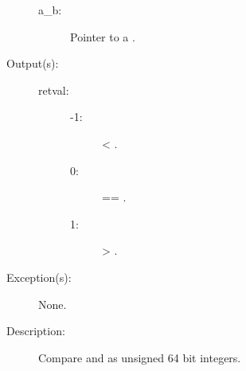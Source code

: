 \begin{description}
\begin{description}
\begin{description}
		\item[a\_b: ]
			Pointer to a .
		\end{description}
	\item[Output(s): ]
		\begin{description}\item[]
		\item[retval: ]
			\begin{description}\item[]
			\item[-1: ]  < .
			\item[0: ]  == .
			\item[1: ]  > .
			\end{description}
		\end{description}
	\item[Exception(s): ] None.
	\item[Description: ]
		Compare  and  as unsigned 64 bit
		integers.
	\end{description}
\end{description}
